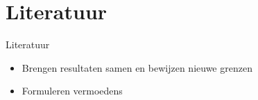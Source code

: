 \documentclass
[kulak] %
{kulakbeamer}
\begin{document}
	\section{Literatuur}
	
	\begin{frame}{Literatuur}
		\begin{itemize}
			\item Brengen resultaten samen en bewijzen nieuwe grenzen \cite{FABRICI202380, PETRUSEVSKI2022385, oddMax8, Malik2023thesis}
			
			\item Formuleren vermoedens \cite{FABRICI202380, PETRUSEVSKI2022385}
		\end{itemize}
	\end{frame}
	
\end{document}
